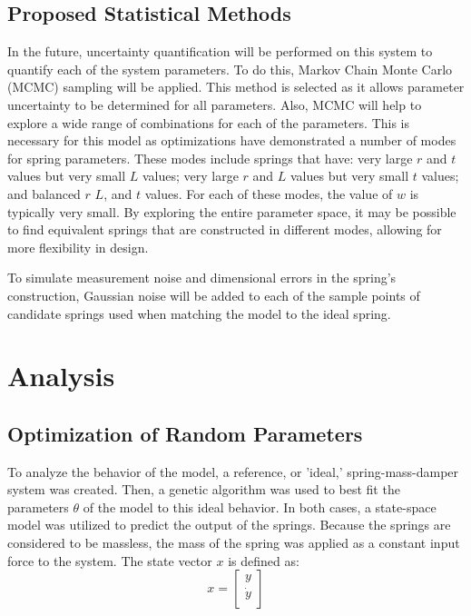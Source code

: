 \documentclass[conference]{article}
\begin{document}
\subsection{Proposed Statistical Methods}

In the future, uncertainty quantification will be performed on this system to quantify each of the system parameters. To do this, Markov Chain Monte Carlo (MCMC) sampling will be applied. This method is selected as it allows parameter uncertainty to be determined for all parameters. Also, MCMC will help to explore a wide range of combinations for each of the parameters. This is necessary for this model as optimizations have demonstrated a number of modes for spring parameters. These modes include springs that have: very large $r$ and $t$ values but very small $L$ values; very large $r$ and $L$ values but very small $t$ values; and balanced $r$ $L$, and $t$ values. For each of these modes, the value of $w$ is typically very small. By exploring the entire parameter space, it may be possible to find equivalent springs that are constructed in different modes, allowing for more flexibility in design.

To simulate measurement noise and dimensional errors in the spring's construction, Gaussian noise will be added to each of the sample points of candidate springs used when matching the model to the ideal spring. 


\section{Analysis}


\subsection{Optimization of Random Parameters}
To analyze the behavior of the model, a reference, or 'ideal,' spring-mass-damper system was created. Then, a genetic algorithm was used to best fit the parameters $\theta$ of the model to this ideal behavior. In both cases, a state-space model was utilized to predict the output of the springs. Because the springs are considered to be massless, the mass of the spring was applied as a constant input force to the system. The state vector $x$ is defined as: 
\begin{equation}
x = \begin{bmatrix}
y\\ \dot{y}\\
\end{bmatrix}
\end{equation}
\end{document}
